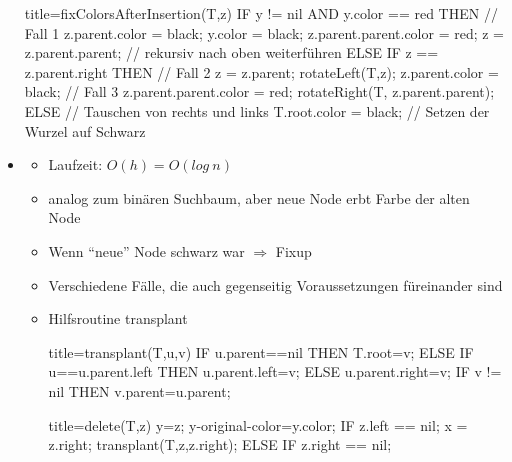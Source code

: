 \documentclass[
    12pt,
    a4paper,
    ngerman,
    color=3b,%
    marginpar=false,
    colorback=false,
    leqno,
]{tudaexercise}
\begin{document}
\begin{itemize}
\begin{ccode}[autogobble,fontsize=\small]{title={fixColorsAfterInsertion(T,z)}}
                    IF y != nil AND y.color == red THEN     // Fall 1
                        z.parent.color = black;
                        y.color = black;
                        z.parent.parent.color = red;
                        z = z.parent.parent;                // rekursiv nach oben weiterführen
                    ELSE                                    
                        IF z == z.parent.right THEN         // Fall 2
                            z = z.parent;
                            rotateLeft(T,z);
                        z.parent.color = black;             // Fall 3
                        z.parent.parent.color = red;
                        rotateRight(T, z.parent.parent);
                ELSE                                        
                    // Tauschen von rechts und links        
                T.root.color = black;                       // Setzen der Wurzel auf Schwarz
            \end{ccode}
            \clearpage
        \item {}
            \begin{itemize}
                \item Laufzeit: $O(h) = O(log~n)$
                \item analog zum binären Suchbaum, aber neue Node erbt Farbe der alten Node
                \item Wenn "`neue"' Node schwarz war $\Rightarrow$ Fixup
                \item Verschiedene Fälle, die auch gegenseitig Voraussetzungen füreinander sind 
                \item Hilfsroutine transplant
                \begin{ccode}[autogobble,fontsize=\small]{title={transplant(T,u,v)}}
                    IF u.parent==nil THEN
                        T.root=v;
                    ELSE
                        IF u==u.parent.left THEN
                            u.parent.left=v;
                        ELSE
                            u.parent.right=v;
                    IF v != nil THEN
                        v.parent=u.parent;
                \end{ccode}
                \begin{ccode}[autogobble,fontsize=\small]{title={delete(T,z)}}
                    y=z;
                    y-original-color=y.color;
                    IF z.left == nil;
                        x = z.right;
                        transplant(T,z,z.right);
                    ELSE IF z.right == nil;

\end{ccode}
\end{itemize}
\end{itemize}
\end{document}
